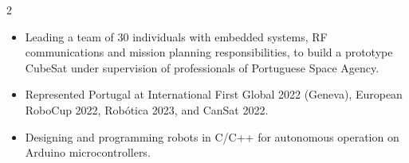 \documentclass[10pt,a4paper,ragged2e,withhyper]{altacv}
\begin{document}
\begin{paracol}{2}
            \begin{itemize}
                \item Leading a team of 30 individuals with embedded systems, RF communications and mission planning responsibilities, to build a prototype CubeSat under supervision of professionals of Portuguese Space Agency.
            \end{itemize}

            \begin{itemize}
                \item Represented Portugal at International First Global 2022 (Geneva), European RoboCup 2022, Robótica 2023, and CanSat 2022.
                \item Designing and programming robots in C/C++ for autonomous operation on Arduino microcontrollers.
            \end{itemize}

    \end{paracol}
\end{document}
